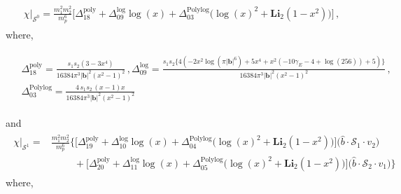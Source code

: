 \begin{align}
    \begin{split} \label{eqt12}   
        \chi\Big|_{\mathcal{S}^0}=\frac{m_1^2m_2^2}{m_p^6}\Bigg[\Delta_{\mathfrak{18}}^{\textrm{poly}}+\Delta_{\mathfrak{09}}^{\textrm{log}}\log(x)+\Delta_{\mathfrak{03}}^{\textrm{Polylog}}\Big(\log(x)^2+ \textbf{Li}_2\left(1-x^2\right)\Big)\Bigg]\,,
          \end{split}
\end{align}
\enlargethispage{2\baselineskip}
where, 
\begin{thesiscompactdisplay}
\begin{align}
    \begin{split} 
  &  \Delta_{\mathfrak{18}}^{\textrm{poly}}= \frac{s_1s_2 (3-3 x^4)}{16384 \pi ^3 |\boldsymbol{b}|^2 \left(x^2-1\right)^2}\,,   \Delta_{\mathfrak{09}}^{\textrm{log}}=\frac{s_1s_2\bigg\{4 \left(-2 x^2 \log \left(\pi  |\boldsymbol{b}|^6\right)+5 x^4+x^2 (-10 \gamma_E -4+\log (256))+5\right)\bigg\}}{16384 \pi ^3 |\boldsymbol{b}|^2 \left(x^2-1\right)^2}\,,   \\& \Delta_{\mathfrak{03}}^{\textrm{Polylog}}=\frac{4\,s_1s_2\,(x-1) x}{16384 \pi ^3 |\boldsymbol{b}|^2 \left(x^2-1\right)^2}
      \end{split}
\end{align}
\end{thesiscompactdisplay}
and 
\begin{align}
    \begin{split} \label{eqt13}  
        \hspace{0cm}\chi\Big|_{\mathcal{S}^1}=&\frac{m_1^2m_2^2}{m_p^6}\Bigg\{\Bigg[\Delta_{\mathfrak{19}}^{\textrm{poly}}+\Delta_{\mathfrak{10}}^{\textrm{log}}\log(x)+\Delta_{\mathfrak{04}}^{\textrm{Polylog}}\Big(\log(x)^2+ \textbf{Li}_2\left(1-x^2\right)\Big)\Bigg]\big(\hat{b}\cdot\mathcal{S}_1\cdot v_2\big)\\&\hspace{1cm}+\Bigg[\Delta_{\mathfrak{20}}^{\textrm{poly}}+\Delta_{\mathfrak{11}}^{\textrm{log}}\log(x)+\Delta_{\mathfrak{05}}^{\textrm{Polylog}}\Big(\log(x)^2+ \textbf{Li}_2\left(1-x^2\right)\Big)\Bigg]\big(\hat{b}\cdot\mathcal{S}_2\cdot v_1\big)\Bigg\}
          \end{split}
\end{align}
\enlargethispage{2\baselineskip}
where,
